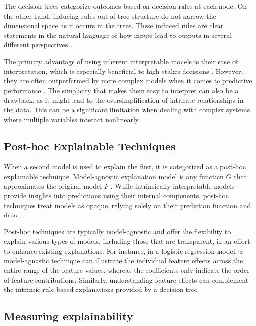 The decision trees categorize outcomes based on decision rules at each node. On the other hand, inducing rules out of tree structure do not narrow the dimensional space as it occurs in the trees. These induced rules are clear statements in the natural language of how inputs lead to outputs in several different perspectives \cite{J.Han2012DataTechniques}.

The primary advantage of using inherent interpretable models is their ease of interpretation, which is especially beneficial to high-stakes decisions \cite{Rudin2019StopInstead}. However, they are often outperformed by more complex models when it comes to predictive performance \cite{Loyola-Gonzalez2019Black-boxView}. The simplicity that makes them easy to interpret can also be a drawback, as it might lead to the oversimplification of intricate relationships in the data. This can be a significant limitation when dealing with complex systems where multiple variables interact nonlinearly.

\subsection{Post-hoc Explainable Techniques}

When a second model is used to explain the first, it is categorized as a post-hoc explainable technique. Model-agnostic explanation model is any function \(G\) that approximates the original model \(F\) \cite{10.5555/3295222.3295230}. While intrinsically interpretable models provide insights into predictions using their internal components, post-hoc techniques treat models as opaque, relying solely on their prediction function and data \cite{Molnar2022Model-agnosticLearning}. 

Post-hoc techniques are typically model-agnostic and offer the flexibility to explain various types of models, including those that are transparent, in an effort to enhance existing explanations. For instance, in a logistic regression model, a model-agnostic technique can illustrate the individual feature effects across the entire range of the feature values, whereas the coefficients only indicate the order of feature contributions. Similarly, understanding feature effects can complement the intrinsic rule-based explanations provided by a decision tree. 

\subsection{Measuring explainability}

